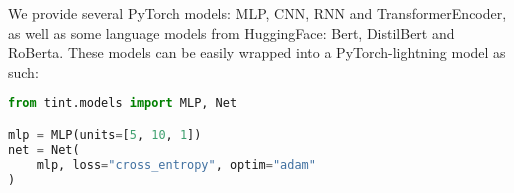 We provide several PyTorch models: MLP, CNN, RNN and TransformerEncoder, as well as some language models
from HuggingFace: Bert, DistilBert and RoBerta.
These models can be easily wrapped into a PyTorch-lightning model as such:

\begin{lstlisting}[language=Python, caption=Model definition example, label={lst:model}]
from tint.models import MLP, Net

mlp = MLP(units=[5, 10, 1])
net = Net(
    mlp, loss="cross_entropy", optim="adam"
)
\end{lstlisting}
